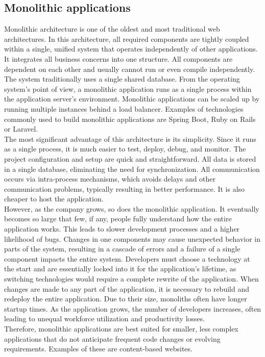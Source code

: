 \subsection{Monolithic applications}
Monolithic architecture is one of the oldest and most traditional web architectures. In this architecture, all required components are tightly coupled within a single, unified system that operates independently of other applications. It integrates all business concerns into one structure. All components are dependent on each other and usually cannot run or even compile independently. The system traditionally uses a single shared database. From the operating system's point of view, a monolithic application runs as a single process within the application server's environment. Monolithic applications can be scaled up by running multiple instances behind a load balancer. Examples of technologies commonly used to build monolithic applications are Spring Boot, Ruby on Rails or Laravel.\\

\noindent
The most significant advantage of this architecture is its simplicity. Since it runs as a single process, it is much easier to test, deploy, debug, and monitor. The project configuration and setup are quick and straightforward. All data is stored in a single database, eliminating the need for synchronization. All communication occurs via intra-process mechanisms, which avoids delays and other communication problems, typically resulting in better performance. It is also cheaper to host the application. \\

\noindent
However, as the company grows, so does the monolithic application. It eventually becomes so large that few, if any, people fully understand how the entire application works. This leads to slower development processes and a higher likelihood of bugs. Changes in one components may cause unexpected behavior in parts of the system, resulting in a cascade of errors and a failure of a single component impacts the entire system. Developers must choose a technology at the start and are essentially locked into it for the application's lifetime, as switching technologies would require a complete rewrite of the application. When changes are made to any part of the application, it is necessary to rebuild and redeploy the entire application. Due to their size, monoliths often have longer startup times. As the application grows, the number of developers increases, often leading to unequal workforce utilization and productivity losses. \\

\noindent
Therefore, monolithic applications are best suited for smaller, less complex applications that do not anticipate frequent code changes or evolving requirements. Examples of these are content-based websites. \cite{Monolith1}\cite{Monolith2}